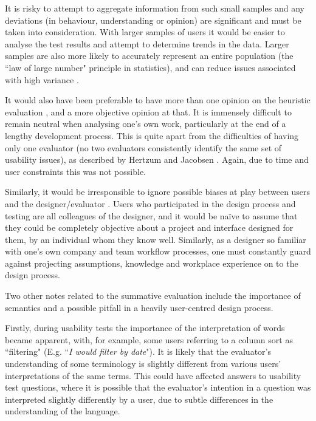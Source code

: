 It is risky to attempt to aggregate information from such small samples \citep{Dicks} and any deviations (in behaviour, understanding or opinion) are significant and must be taken into consideration. With larger samples of users it would be easier to analyse the test results and attempt to determine trends in the data. Larger samples are also more likely to accurately represent an entire population (the ``law of large number" principle in statistics), and can reduce issues associated with high variance \citep[p. 132 \& 235]{Gravetter}. 

It would also have been preferable to have more than one opinion on the heuristic evaluation \citep{NielsenHow}, and a more objective opinion at that. It is immensely difficult to remain neutral when analysing one's own work, particularly at the end of a lengthy development process. This is quite apart from the difficulties of having only one evaluator (no two evaluators consistently identify the same set of usability issues), as described by Hertzum and Jacobsen \citep{Hertzum}. Again, due to time and user constraints this was not possible. 

Similarly, it would be irresponsible to ignore possible biases at play between users and the designer/evaluator \citep{Dumas}. Users who participated in the design process and testing are all colleagues of the designer, and it would be na\"{i}ve to assume that they could be completely objective about a project and interface designed for them, by an individual whom they know well. Similarly, as a designer so familiar with one's own company and team workflow processes, one must constantly guard against projecting assumptions, knowledge and workplace experience on to the design process.

Two other notes related to the summative evaluation include the importance of semantics and a possible pitfall in a heavily user-centred design process. 

Firstly, during usability tests the importance of the interpretation of words became apparent, with, for example, some users referring to a column sort as ``filtering" (E.g. ``\textit{I would filter by date}"). It is likely that the evaluator's understanding of some terminology is slightly different from various users' interpretations of the same terms. This could have affected answers to usability test questions, where it is possible that the evaluator's intention in a question was interpreted slightly differently by a user, due to subtle differences in the understanding of the language. 

